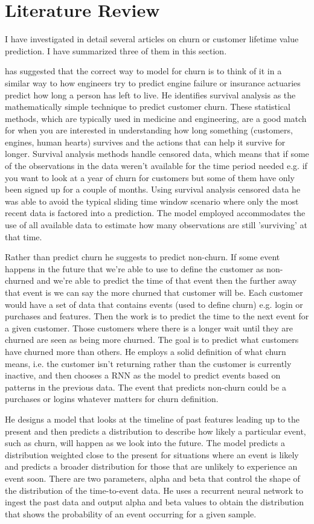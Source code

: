 \documentclass[final,a4paper,peerreviewca]{IEEEtran}
\begin{document}
\section{Literature Review}
I have investigated in detail several articles on churn or customer lifetime value prediction. I have summarized three of them in this section.

\cite{Martinsson:2016} has suggested that the correct way to model for churn is to think of it in a similar way to how engineers try to predict engine failure or insurance actuaries predict how long a person has left to live. He identifies survival analysis as the mathematically simple technique to predict customer churn. These statistical methods, which are typically used in medicine and engineering, are a good match for when you are interested in understanding how long something (customers, engines, human hearts) survives and the actions that can help it survive for longer. Survival analysis methods handle censored data, which means that if some of the observations in the data weren't available for the time period needed e.g. if you want to look at a year of churn for customers but some of them have only been signed up for a couple of months. Using survival analysis censored data he was able to avoid the typical sliding time window scenario where only the most recent data is factored into a prediction. The model employed accommodates the use of all available data to estimate how many observations are still 'surviving' at that time. 

Rather than predict churn he suggests to predict non-churn. If some event happens in the future that we're able to use to define the customer as non-churned and we're able to predict the time of that event then the further away that event is we can say the more churned that customer will be. Each customer would have a set of data that contains events (used to define churn) e.g. login or purchases and features. Then the work is to predict the time to the next event for a given customer. Those customers where there is a longer wait until they are churned are seen as being more churned. The goal is to predict what customers have churned more than others. He employs a solid definition of what churn means, i.e. the customer isn't returning rather than the customer is currently inactive, and then chooses a RNN as the model to predict events based on patterns in the previous data. The event that predicts non-churn could be a purchases or logins whatever matters for churn definition.

He designs a model that looks at the timeline of past features leading up to the present and then predicts a distribution to describe how likely a particular event, such as churn, will happen as we look into the future. The model predicts a distribution weighted close to the present for situations where an event is likely and predicts a broader distribution for those that are unlikely to experience an event soon. There are two parameters, alpha and beta that control the shape of the distribution of the time-to-event data. He uses a recurrent neural network to ingest the past data and output alpha and beta values to obtain the distribution that shows the probability of an event occurring for a given sample. 
\end{document}
